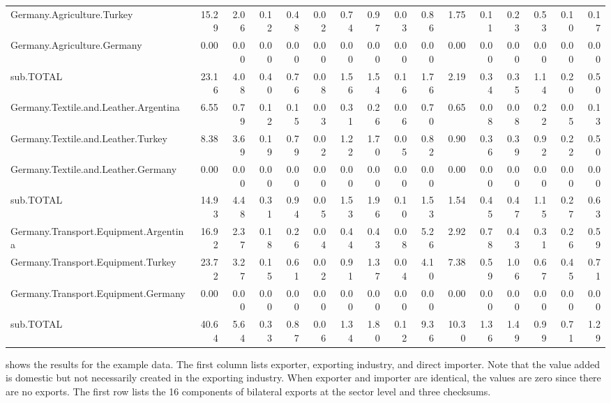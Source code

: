 \documentclass[a4paper]{article}\usepackage[]{graphicx}\usepackage[]{color}
\begin{document}
\begin{sidewaystable}[htbp]
\begin{tabular}{lrrrrrrrrrrrrrrr}
    Germany.Agriculture.Turkey & 15.29 & 2.06  & 0.12  & 0.48  & 0.02  & 0.74  & 0.97  & 0.03  & 0.86  & 1.75  & 0.11  & 0.23  & 0.53  & 0.10  & 0.17 \\
    Germany.Agriculture.Germany & 0.00  & 0.00  & 0.00  & 0.00  & 0.00  & 0.00  & 0.00  & 0.00  & 0.00  & 0.00  & 0.00  & 0.00  & 0.00  & 0.00  & 0.00 \\
    sub.TOTAL & 23.16 & 4.08  & 0.40  & 0.76  & 0.08  & 1.56  & 1.54  & 0.16  & 1.76  & 2.19  & 0.34  & 0.35  & 1.14  & 0.20  & 0.50 \\
    Germany.Textile.and.Leather.Argentina & 6.55  & 0.79  & 0.12  & 0.15  & 0.03  & 0.31  & 0.26  & 0.06  & 0.70  & 0.65  & 0.08  & 0.08  & 0.22  & 0.05  & 0.13 \\
    Germany.Textile.and.Leather.Turkey & 8.38  & 3.69  & 0.19  & 0.79  & 0.02  & 1.22  & 1.70  & 0.05  & 0.82  & 0.90  & 0.36  & 0.39  & 0.92  & 0.22  & 0.50 \\
    Germany.Textile.and.Leather.Germany & 0.00  & 0.00  & 0.00  & 0.00  & 0.00  & 0.00  & 0.00  & 0.00  & 0.00  & 0.00  & 0.00  & 0.00  & 0.00  & 0.00  & 0.00 \\
    sub.TOTAL & 14.93 & 4.48  & 0.31  & 0.94  & 0.05  & 1.53  & 1.96  & 0.10  & 1.53  & 1.54  & 0.45  & 0.47  & 1.15  & 0.27  & 0.63 \\
    Germany.Transport.Equipment.Argentina & 16.92 & 2.37  & 0.18  & 0.26  & 0.04  & 0.44  & 0.43  & 0.08  & 5.26  & 2.92  & 0.78  & 0.43  & 0.31  & 0.26  & 0.59 \\
    Germany.Transport.Equipment.Turkey & 23.72 & 3.27  & 0.15  & 0.61  & 0.02  & 0.91  & 1.37  & 0.04  & 4.10  & 7.38  & 0.59  & 1.06  & 0.67  & 0.45  & 0.71 \\
    Germany.Transport.Equipment.Germany & 0.00  & 0.00  & 0.00  & 0.00  & 0.00  & 0.00  & 0.00  & 0.00  & 0.00  & 0.00  & 0.00  & 0.00  & 0.00  & 0.00  & 0.00 \\
    sub.TOTAL & 40.64 & 5.64  & 0.33  & 0.87  & 0.06  & 1.34  & 1.80  & 0.12  & 9.36  & 10.30 & 1.36  & 1.49  & 0.99  & 0.71  & 1.29 \\
    \bottomrule
    \end{tabular}
\end{sidewaystable}


 shows the results for the example data. 
The first column lists exporter, exporting industry, and direct importer. 
Note that the value added is domestic but not necessarily created in the exporting industry. 
When exporter and importer are identical, the values are zero since there are no exports. 
The first row lists the 16 components of bilateral exports at the sector level and three checksums.
\end{document}
